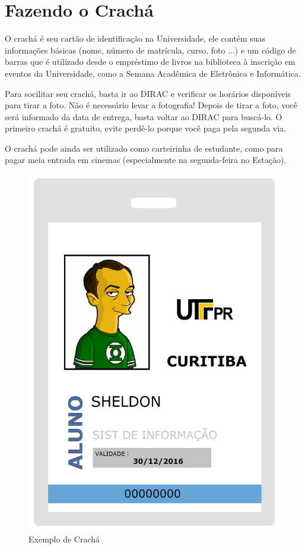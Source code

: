 \documentclass[a4paper,12pt,openany]{article}
\begin{document}
\newpage
\section{Fazendo o Crachá}

O crachá é seu cartão de identificação na Universidade, ele contém suas informações básicas (nome, número de matrícula, curso, foto ...) e um código de barras que é utilizado desde o empréstimo de livros na biblioteca à inscrição em eventos da Universidade, como a Semana Acadêmica de Eletrônica e Informática. 

Para socilitar seu crachá, basta ir ao DIRAC e verificar os horários disponíveis para tirar a foto. Não é necessário levar a fotografia! Depois de tirar a foto, você será informado da data de entrega, basta voltar ao DIRAC para buscá-lo. O primeiro crachá é gratuito, evite perdê-lo porque você paga pela segunda via.

O crachá pode ainda ser utilizado como carteirinha de estudante, como para pagar meia entrada em cinemas (especialmente na segunda-feira no Estação).

	\begin{figure}[ht!]  \centering
		\includegraphics[scale=0.4]{cracha_sheldon.png}
		\caption{Exemplo de Crachá}
	\end{figure}
\end{document}

